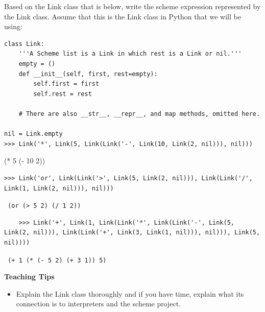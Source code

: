 \begin{blocksection}
\question Based on the Link class that is below, write the scheme expression represented by the Link class.  
Assume that this is the Link class in Python that we will be using:
\begin{lstlisting}
class Link:
    '''A Scheme list is a Link in which rest is a Link or nil.'''
    empty = ()
    def __init__(self, first, rest=empty):
        self.first = first
        self.rest = rest

    # There are also __str__, __repr__, and map methods, omitted here.

nil = Link.empty
>>> Link('*', Link(5, Link(Link('-', Link(10, Link(2, nil))), nil)))
\end{lstlisting}
\begin{solution}
(* 5 (- 10 2))
\end{solution}

\begin{lstlisting}
>>> Link('or', Link(Link('>', Link(5, Link(2, nil))), Link(Link('/', Link(1, Link(2, nil))), nil)))
\end{lstlisting}
\begin{solution}
\verb! (or (> 5 2) (/ 1 2))!
\end{solution}

\begin{lstlisting}
    >>> Link('+', Link(1, Link(Link('*', Link(Link('-', Link(5, Link(2, nil))), Link(Link('+', Link(3, Link(1, nil))), nil))), Link(5, nil))))
\end{lstlisting}

\begin{solution}
\verb! (+ 1 (* (- 5 2) (+ 3 1)) 5)!
\end{solution}
    
\end{blocksection}



\begin{guide}
    \begin{blocksection}
        \textbf{Teaching Tips}
        \begin{itemize}
        \item Explain the Link class thoroughly and if you have time, explain what its connection is to interpreters and the scheme project. 
        \end{itemize}
    \end{blocksection}
    \end{guide}